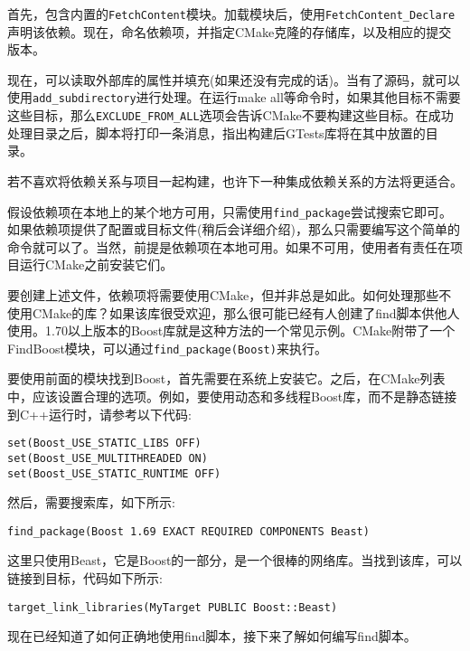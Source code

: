 首先，包含内置的\texttt{FetchContent}模块。加载模块后，使用\texttt{FetchContent\_Declare}声明该依赖。现在，命名依赖项，并指定CMake克隆的存储库，以及相应的提交版本。

现在，可以读取外部库的属性并填充(如果还没有完成的话)。当有了源码，就可以使用\texttt{add\_subdirectory}进行处理。在运行make all等命令时，如果其他目标不需要这些目标，那么\texttt{EXCLUDE\_FROM\_ALL}选项会告诉CMake不要构建这些目标。在成功处理目录之后，脚本将打印一条消息，指出构建后GTests库将在其中放置的目录。

若不喜欢将依赖关系与项目一起构建，也许下一种集成依赖关系的方法将更适合。


假设依赖项在本地上的某个地方可用，只需使用\texttt{find\_package}尝试搜索它即可。如果依赖项提供了配置或目标文件(稍后会详细介绍)，那么只需要编写这个简单的命令就可以了。当然，前提是依赖项在本地可用。如果不可用，使用者有责任在项目运行CMake之前安装它们。

要创建上述文件，依赖项将需要使用CMake，但并非总是如此。如何处理那些不使用CMake的库？如果该库很受欢迎，那么很可能已经有人创建了find脚本供他人使用。1.70以上版本的Boost库就是这种方法的一个常见示例。CMake附带了一个FindBoost模块，可以通过\texttt{find\_package(Boost)}来执行。

要使用前面的模块找到Boost，首先需要在系统上安装它。之后，在CMake列表中，应该设置合理的选项。例如，要使用动态和多线程Boost库，而不是静态链接到C++运行时，请参考以下代码:

\begin{lstlisting}[style=styleCMake]
set(Boost_USE_STATIC_LIBS OFF)
set(Boost_USE_MULTITHREADED ON)
set(Boost_USE_STATIC_RUNTIME OFF)
\end{lstlisting}

然后，需要搜索库，如下所示:

\begin{lstlisting}[style=styleCMake]
find_package(Boost 1.69 EXACT REQUIRED COMPONENTS Beast)
\end{lstlisting}

这里只使用Beast，它是Boost的一部分，是一个很棒的网络库。当找到该库，可以链接到目标，代码如下所示:

\begin{lstlisting}[style=styleCMake]
target_link_libraries(MyTarget PUBLIC Boost::Beast)
\end{lstlisting}

现在已经知道了如何正确地使用find脚本，接下来了解如何编写find脚本。

